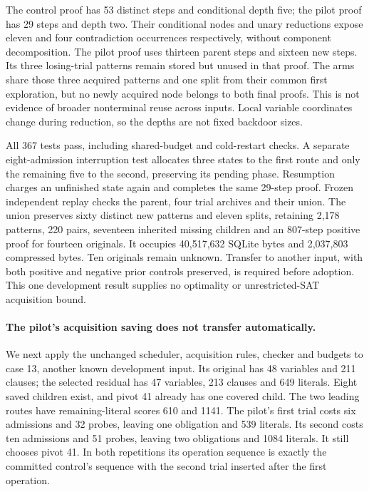 \documentclass[11pt,a4paper]{article}
\numberwithin{equation}{section}
\theoremstyle{plain}
\theoremstyle{definition}
\theoremstyle{remark}
\begin{document}
The control proof has 53 distinct steps and conditional depth five; the pilot
proof has 29 steps and depth two. Their conditional nodes and unary reductions
expose eleven and four contradiction occurrences respectively, without component
decomposition. The pilot proof uses thirteen parent steps and sixteen new steps.
Its three losing-trial patterns remain stored but unused in that proof. The arms
share those three acquired patterns and one split from their common first
exploration, but no newly acquired node belongs to both final proofs. This is
not evidence of broader nonterminal reuse across inputs. Local variable
coordinates change during reduction, so the depths are not fixed backdoor sizes.

All 367 tests pass, including shared-budget and cold-restart checks. A separate
eight-admission interruption test allocates three states to the first route and
only the remaining five to the second, preserving its pending phase. Resumption
charges an unfinished state again and completes the same 29-step proof. Frozen
independent replay checks the parent, four trial archives and their union.
The union preserves sixty distinct new patterns and eleven splits, retaining
2,178 patterns, 220 pairs, seventeen inherited missing children and an 807-step
positive proof for fourteen originals. It occupies 40,517,632 SQLite bytes and
2,037,803 compressed bytes. Ten originals remain unknown. Transfer to another
input, with both positive and negative prior controls preserved, is required
before adoption. This one development result supplies no optimality or
unrestricted-SAT acquisition bound.

\paragraph{The pilot's acquisition saving does not transfer automatically.}
We next apply the unchanged scheduler, acquisition rules, checker and budgets
to case 13, another known development input. Its original has 48 variables and
211 clauses; the selected residual has 47 variables, 213 clauses and 649 literals.
Eight saved children exist, and pivot 41 already has one covered child. The two
leading routes have remaining-literal scores 610 and 1141. The pilot's first
trial costs six admissions and 32 probes, leaving one obligation and 539 literals.
Its second costs ten admissions and 51 probes, leaving two obligations and 1084
literals. It still chooses pivot 41. In both repetitions its operation sequence
is exactly the committed control's sequence with the second trial inserted
after the first operation.
\end{document}
